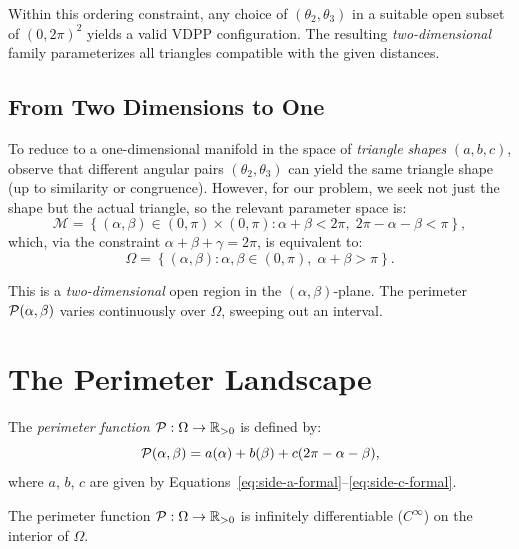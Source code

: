 Within this ordering constraint, any choice of $(\theta_2, \theta_3)$ in a suitable open subset of $(0, 2\pi)^2$ yields a valid VDPP configuration. The resulting \emph{two-dimensional} family parameterizes all triangles compatible with the given distances.

\subsection{From Two Dimensions to One}

To reduce to a one-dimensional manifold in the space of \emph{triangle shapes} $(a, b, c)$, observe that different angular pairs $(\theta_2, \theta_3)$ can yield the same triangle shape (up to similarity or congruence). However, for our problem, we seek not just the shape but the actual triangle, so the relevant parameter space is:
\begin{equation}
\mathcal{M} = \left\{(\alpha, \beta) \in (0, \pi) \times (0, \pi) : \alpha + \beta < 2\pi, \; 2\pi - \alpha - \beta < \pi \right\},
\end{equation}
which, via the constraint $\alpha + \beta + \gamma = 2\pi$, is equivalent to:
\begin{equation}
\Omega = \left\{(\alpha, \beta) : \alpha, \beta \in (0, \pi), \; \alpha + \beta > \pi \right\}.
\end{equation}

This is a \emph{two-dimensional} open region in the $(\alpha, \beta)$-plane. The perimeter $\mathcal{P}(\alpha, \beta)$ varies continuously over $\Omega$, sweeping out an interval.

\section{The Perimeter Landscape}

\begin{definition}
The \emph{perimeter function} $\mathcal{P}: \Omega \to \mathbb{R}_{>0}$ is defined by:
\begin{equation}
\mathcal{P}(\alpha, \beta) = a(\alpha) + b(\beta) + c(2\pi - \alpha - \beta),
\end{equation}
where $a$, $b$, $c$ are given by Equations~\eqref{eq:side-a-formal}--\eqref{eq:side-c-formal}.
\end{definition}

\begin{theorem}
The perimeter function $\mathcal{P}: \Omega \to \mathbb{R}_{>0}$ is infinitely differentiable ($C^\infty$) on the interior of $\Omega$.
\end{theorem}

